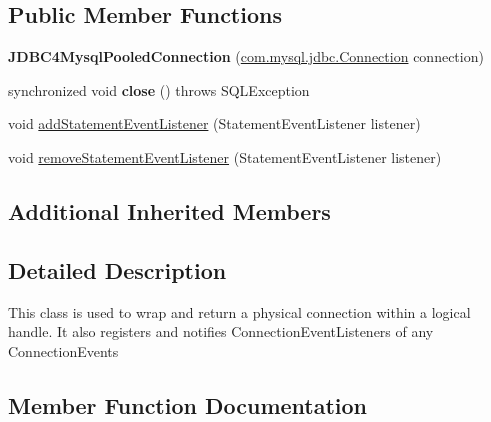 \subsection*{Public Member Functions}
\begin{DoxyCompactItemize}
\item 
\mbox{\label{classcom_1_1mysql_1_1jdbc_1_1jdbc2_1_1optional_1_1_j_d_b_c4_mysql_pooled_connection_a80351f040d0adf0bbef56995c761626e}} 
{\bfseries J\+D\+B\+C4\+Mysql\+Pooled\+Connection} (\mbox{\hyperlink{interfacecom_1_1mysql_1_1jdbc_1_1_connection}{com.\+mysql.\+jdbc.\+Connection}} connection)
\item 
\mbox{\label{classcom_1_1mysql_1_1jdbc_1_1jdbc2_1_1optional_1_1_j_d_b_c4_mysql_pooled_connection_a98f59301b7dd941bc74c05497342cad0}} 
synchronized void {\bfseries close} ()  throws S\+Q\+L\+Exception 
\item 
void \mbox{\hyperlink{classcom_1_1mysql_1_1jdbc_1_1jdbc2_1_1optional_1_1_j_d_b_c4_mysql_pooled_connection_a2b428dac99e43f2bac5ad37f299e0975}{add\+Statement\+Event\+Listener}} (Statement\+Event\+Listener listener)
\item 
void \mbox{\hyperlink{classcom_1_1mysql_1_1jdbc_1_1jdbc2_1_1optional_1_1_j_d_b_c4_mysql_pooled_connection_a85fee01b184f403b8d44d40502c4f5ef}{remove\+Statement\+Event\+Listener}} (Statement\+Event\+Listener listener)
\end{DoxyCompactItemize}
\subsection*{Additional Inherited Members}


\subsection{Detailed Description}
This class is used to wrap and return a physical connection within a logical handle. It also registers and notifies Connection\+Event\+Listeners of any Connection\+Events 

\subsection{Member Function Documentation}
\mbox{\label{classcom_1_1mysql_1_1jdbc_1_1jdbc2_1_1optional_1_1_j_d_b_c4_mysql_pooled_connection_a2b428dac99e43f2bac5ad37f299e0975}} 
